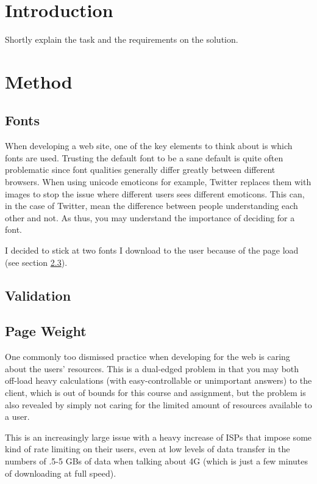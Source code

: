 \documentclass[a4paper]{scrartcl}
\begin{document}
\section{Introduction}

Shortly explain the task and the requirements on the solution.

\section{Method}

\subsection{Fonts}

When developing a web site, one of the key elements to think about is which fonts are used. Trusting the default font to be a sane default is quite often problematic since font qualities generally differ greatly between different browsers. When using unicode emoticons for example, Twitter replaces them with images to stop the issue where different users sees different emoticons. This can, in the case of Twitter, mean the difference between people understanding each other and not. As thus, you may understand the importance of deciding for a font.

I decided to stick at two fonts I download to the user because of the page load (see section \ref{subsec:PageWeight}).

\subsection{Validation}

\subsection{Page Weight}
\label{subsec:PageWeight}

One commonly too dismissed practice when developing for the web is caring about the users' resources. This is a dual-edged problem in that you may both off-load heavy calculations (with easy-controllable or unimportant answers) to the client, which is out of bounds for this course and assignment, but the problem is also revealed by simply not caring for the limited amount of resources available to a user.

This is an increasingly large issue with a heavy increase of ISPs that impose some kind of rate limiting on their users, even at low levels of data transfer in the numbers of .5-5 GBs of data when talking about 4G (which is just a few minutes of downloading at full speed).
\end{document}
